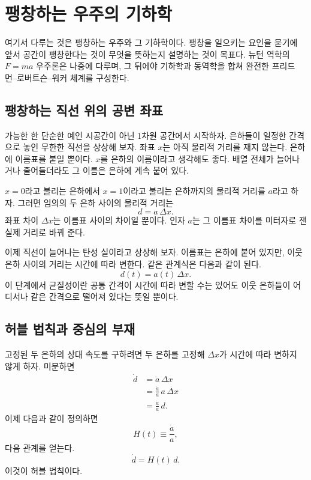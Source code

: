 \chapter{팽창하는 우주의 기하학}

여기서 다루는 것은 팽창하는 우주와 그 기하학이다. 팽창을 일으키는 요인을 묻기에 앞서 공간이 팽창한다는 것이 무엇을 뜻하는지 설명하는 것이 목표다. 뉴턴 역학의 \(F=ma\) 우주론은 나중에 다루며, 그 뒤에야 기하학과 동역학을 합쳐 완전한 프리드먼--로버트슨--워커 체계를 구성한다.

\section{팽창하는 직선 위의 공변 좌표}

가능한 한 단순한 예인 시공간이 아닌 1차원 공간에서 시작하자. 은하들이 일정한 간격으로 놓인 무한한 직선을 상상해 보자. 좌표 \(x\)는 아직 물리적 거리를 재지 않는다. 은하에 이름표를 붙일 뿐이다. \(x\)를 은하의 이름이라고 생각해도 좋다. 배열 전체가 늘어나거나 줄어들더라도 그 이름은 은하에 계속 붙어 있다.

\(x=0\)라고 불리는 은하에서 \(x=1\)이라고 불리는 은하까지의 물리적 거리를 \(a\)라고 하자. 그러면 임의의 두 은하 사이의 물리적 거리는
\begin{equation}
d=a\,\Delta x.
\end{equation}
좌표 차이 \(\Delta x\)는 이름표 사이의 차이일 뿐이다. 인자 \(a\)는 그 이름표 차이를 미터자로 잰 실제 거리로 바꿔 준다.

이제 직선이 늘어나는 탄성 실이라고 상상해 보자. 이름표는 은하에 붙어 있지만, 이웃 은하 사이의 거리는 시간에 따라 변한다. 같은 관계식은 다음과 같이 된다.
\begin{equation}
d(t)=a(t)\,\Delta x.
\end{equation}
이 단계에서 균질성이란 공통 간격이 시간에 따라 변할 수는 있어도 이웃 은하들이 어디서나 같은 간격으로 떨어져 있다는 뜻일 뿐이다.

\section{허블 법칙과 중심의 부재}

고정된 두 은하의 상대 속도를 구하려면 두 은하를 고정해 \(\Delta x\)가 시간에 따라 변하지 않게 하자. 미분하면
\begin{align}
\dot d &= \dot a\,\Delta x \\
       &= \frac{\dot a}{a}\,a\,\Delta x \\
       &= \frac{\dot a}{a}\,d.
\end{align}
이제 다음과 같이 정의하면
\begin{equation}
H(t)\equiv \frac{\dot a}{a},
\end{equation}
다음 관계를 얻는다.
\begin{equation}
\dot d = H(t)\,d.
\end{equation}
이것이 허블 법칙이다.

